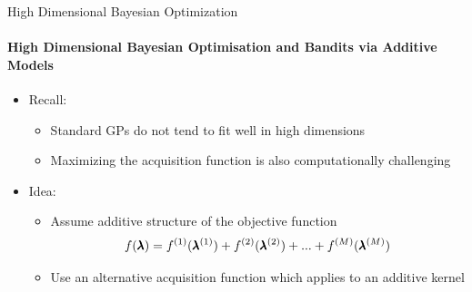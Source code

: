 \begin{frame}[c]{High Dimensional Bayesian Optimization}
\framesubtitle{High Dimensional Bayesian Optimisation and Bandits via Additive Models}

\vspace{2em}
\begin{itemize}
    \item Recall:

    \begin{itemize}
        \item Standard GPs do not tend to fit well in high dimensions
        \item Maximizing the acquisition function is also computationally challenging
        \pause
    \end{itemize}
\medskip
    \item Idea:
    \begin{itemize}
        \item Assume additive structure of the objective function
        \begin{equation*}
            f(\pmb{\lambda})=f^{(1)}(\pmb{\lambda}^{(1)})+f^{(2)}(\pmb{\lambda}^{(2)})+...+f^{(M)}(\pmb{\lambda}^{(M)})
        \end{equation*}
        \item Use an alternative acquisition function which applies to an additive kernel
    \end{itemize}
\end{itemize}

\end{frame}

